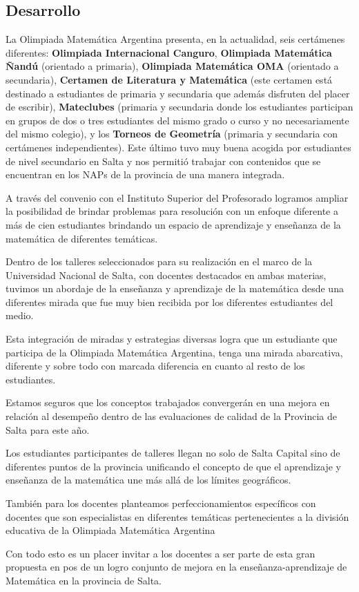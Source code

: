 \subsection{Desarrollo}

La Olimpiada Matemática Argentina presenta, en la actualidad, seis certámenes diferentes: \textbf{Olimpiada Internacional Canguro}, \textbf{Olimpiada Matemática Ñandú} (orientado a primaria), \textbf{Olimpiada Matemática OMA} (orientado a secundaria), \textbf{Certamen de Literatura y Matemática} (este certamen está destinado a estudiantes de primaria y secundaria que además disfruten del placer de escribir), \textbf{Mateclubes} (primaria y secundaria donde los estudiantes participan en grupos de dos o tres estudiantes del mismo grado o curso y no necesariamente del mismo colegio), y los \textbf{Torneos de Geometría} (primaria y secundaria con certámenes independientes). Este último tuvo muy buena acogida por estudiantes de nivel secundario en Salta y nos permitió trabajar con contenidos que se encuentran en los NAPs de la provincia de una manera integrada.

A través del convenio con el Instituto Superior del Profesorado logramos ampliar la posibilidad de brindar problemas para resolución con un enfoque diferente a más de cien estudiantes brindando un espacio de aprendizaje y enseñanza de la matemática de diferentes temáticas.

Dentro de los talleres seleccionados para su realización en el marco de la Universidad Nacional de Salta, con docentes destacados en ambas materias, tuvimos un abordaje de la enseñanza y aprendizaje de la matemática desde una diferentes mirada que fue muy bien recibida por los diferentes estudiantes del medio.

Esta integración de miradas y estrategias diversas logra que un estudiante que participa de la Olimpiada Matemática Argentina, tenga una mirada abarcativa, diferente y sobre todo con marcada diferencia en cuanto al resto de los estudiantes.

Estamos seguros que los conceptos trabajados convergerán en una mejora en relación al desempeño dentro de las evaluaciones de calidad de la Provincia de Salta para este año.

Los estudiantes participantes de talleres llegan no solo de Salta Capital sino de diferentes puntos de la provincia unificando el concepto de que el aprendizaje y enseñanza de la matemática une más allá de los límites geográficos.

También para los docentes planteamos perfeccionamientos específicos con docentes que son especialistas en diferentes temáticas pertenecientes a la división educativa de la Olimpiada Matemática Argentina

Con todo esto es un placer invitar a los docentes a ser parte de esta gran propuesta en pos de un logro conjunto de mejora en la enseñanza-aprendizaje de Matemática en la provincia de Salta.